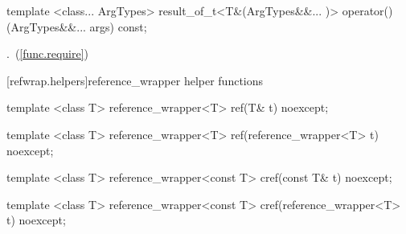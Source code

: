 %
%
\begin{itemdecl}
template <class... ArgTypes>
  result_of_t<T&(ArgTypes&&... )>
    operator()(ArgTypes&&... args) const;
\end{itemdecl}

\begin{itemdescr}
\pnum\returns {}.~(\ref{func.require})
\end{itemdescr}


[refwrap.helpers]{reference_wrapper helper functions}

%
%
\begin{itemdecl}
template <class T> reference_wrapper<T> ref(T& t) noexcept;
\end{itemdecl}

\begin{itemdescr}
\pnum\returns {}
\end{itemdescr}

%
%
\begin{itemdecl}
template <class T> reference_wrapper<T> ref(reference_wrapper<T> t) noexcept;
\end{itemdecl}

\begin{itemdescr}
\pnum\returns {}
\end{itemdescr}

%
%
\begin{itemdecl}
template <class T> reference_wrapper<const T> cref(const T& t) noexcept;
\end{itemdecl}

\begin{itemdescr}
\pnum\returns {}
\end{itemdescr}

%
%
\begin{itemdecl}
template <class T> reference_wrapper<const T> cref(reference_wrapper<T> t) noexcept;
\end{itemdecl}

